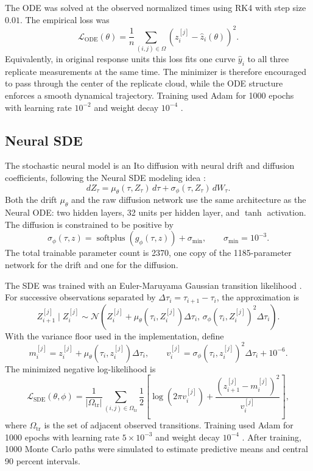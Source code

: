 \documentclass[11pt]{article}
\begin{document}
The ODE was solved at the observed normalized times using RK4 with step size
$0.01$. The empirical loss was
$$
  \mathcal L_{\mathrm{ODE}}(\theta)
  =
  \frac{1}{n}
  \sum_{(i,j)\in\Omega}
  \left(z_i^{[j]}-\widehat z_i(\theta)\right)^2.
$$
Equivalently, in original response units this loss fits one curve
$\widehat y_i$ to all three replicate measurements at the same time. The
minimizer is therefore encouraged to pass through the center of the replicate
cloud, while the ODE structure enforces a smooth dynamical trajectory.
Training used Adam for 1000 epochs with learning rate $10^{-2}$ and weight
decay $10^{-4}$ \citep{kingma2015adam}.

\subsection{Neural SDE}

The stochastic neural model is an Ito diffusion with neural drift and diffusion
coefficients, following the Neural SDE modeling idea
\citep{tzen2019neuralsde,kidger2021neuralsdegan}:
$$
  dZ_\tau
  =
  \mu_\theta(\tau,Z_\tau)\,d\tau
  +
  \sigma_\phi(\tau,Z_\tau)\,dW_\tau.
$$
Both the drift $\mu_\theta$ and the raw diffusion network use the same
architecture as the Neural ODE: two hidden layers, 32 units per hidden layer,
and $\tanh$ activation. The diffusion is constrained to be positive by
$$
  \sigma_\phi(\tau,z)
  =
  \operatorname{softplus}(g_\phi(\tau,z))+\sigma_{\min},
  \qquad
  \sigma_{\min}=10^{-3}.
$$
The total trainable parameter count is 2370, one copy of the 1185-parameter
network for the drift and one for the diffusion.

The SDE was trained with an Euler-Maruyama Gaussian transition likelihood
\citep{kloeden1992numerical}. For successive observations separated by
$\Delta\tau_i=\tau_{i+1}-\tau_i$, the approximation is
$$
  Z_{i+1}^{[j]}\mid Z_i^{[j]}
  \sim
  \mathcal N\left(
    Z_i^{[j]}+\mu_\theta(\tau_i,Z_i^{[j]})\Delta\tau_i,\,
    \sigma_\phi(\tau_i,Z_i^{[j]})^2\Delta\tau_i
  \right).
$$
With the variance floor used in the implementation, define
$$
  m_i^{[j]}=z_i^{[j]}+\mu_\theta(\tau_i,z_i^{[j]})\Delta\tau_i,
  \qquad
  v_i^{[j]}=\sigma_\phi(\tau_i,z_i^{[j]})^2\Delta\tau_i+10^{-6}.
$$
The minimized negative log-likelihood is
$$
  \mathcal L_{\mathrm{SDE}}(\theta,\phi)
  =
  \frac{1}{|\Omega_{\mathrm{tr}}|}
  \sum_{(i,j)\in\Omega_{\mathrm{tr}}}
  \frac{1}{2}
  \left[
    \log(2\pi v_i^{[j]})
    +
    \frac{(z_{i+1}^{[j]}-m_i^{[j]})^2}{v_i^{[j]}}
  \right],
$$
where $\Omega_{\mathrm{tr}}$ is the set of adjacent observed transitions.
Training used Adam for 1000 epochs with learning rate $5\times10^{-3}$ and
weight decay $10^{-4}$ \citep{kingma2015adam}. After training, 1000 Monte Carlo
paths were simulated to estimate predictive means and central 90 percent
intervals.
\end{document}
